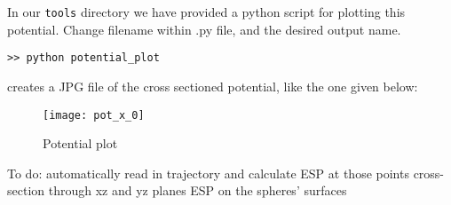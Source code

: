 \medskip

In our \texttt{tools} directory we have provided a python script for plotting this potential.
Change filename within .py file, and the desired output name.
\begin{lstlisting}[style = MyBash]
>> python potential_plot
\end{lstlisting}

\medskip

creates a JPG file of the cross sectioned potential, like the one given below:

\begin{figure}[!htbp]
  \centering
    \texttt{[image: pot\_x\_0]}
    \caption{Potential plot}
\end{figure}

To do: automatically read in trajectory and calculate ESP at those points
	cross-section through xz and yz planes
	ESP on the spheres' surfaces
	
%
%
%
%
%
%
%
%




